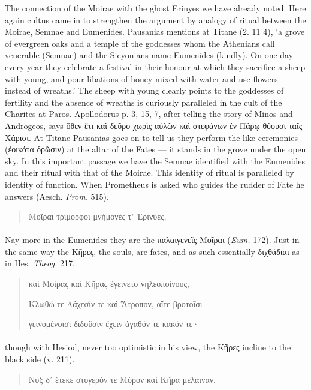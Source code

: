 \documentclass[a4paper, 11pt, oneside, polutonikogreek, english]{article}
\begin{document}
The connection of the Moirae with the ghost Erinyes we have already noted. Here again cultus came in to strengthen the argument by analogy of ritual between the Moirae, Semnae and Eumenides. Pausanias mentions at Titane (2. 11 4), `a grove of evergreen oaks and a temple of the goddesses whom the Athenians call venerable (Semnae) and the Sicyonians name Eumenides (kindly). On one day every year they celebrate a festival in their honour at which they sacrifice a sheep with young, and pour libations of honey mixed with water and use flowers instead of wreaths.' The sheep with young clearly points to the goddesses of fertility and the absence of wreaths is curiously paralleled in the cult of the Charites at Paros. Apollodorus p. 3, 15, 7, after telling the story of Minos and Androgeos, says ὅθεν ἔτι καὶ δεῦρο χωρὶς αὐλῶν καὶ στεφάνων ἐν Πάρῳ θύουσι ταῖς Χάρισι. At Titane Pausanias goes on to tell us they perform the like ceremonies (ἐοικότα δρῶσιν) at the altar of the Fates --- it stands in the grove under the open sky. In this important passage we have the Semnae identified with the Eumenides and their ritual with that of the Moirae. This identity of ritual is paralleled by identity of function. When Prometheus is asked who guides the rudder of Fate he answers (Aesch. \emph{Prom.} 515).
\begin{quotation}
Μοῖραι τρίμορφοι μνήμονές τ' Ἐρινύες.
\end{quotation}
\paragraph{}
Nay more in the Eumenides they are the παλαιγενεῖς Μοῖραι (\emph{Eum.} 172). Just in the same way the Κῆρες, the souls, are fates, and as such essentially διχθάδιαι as in Hes. \emph{Theog.} 217.
\begin{quotation}
καὶ Μοίρας καὶ Κῆρας ἐγείνετο νηλεοποίνους,

Κλωθώ τε Λάχεσίν τε καὶ Ἄτροπον, αἴτε βροτοῖσι

γεινομένοισι διδοῦσιν ἔχειν ἀγαθόν τε κακόν τε·
\end{quotation}
\paragraph{}
though with Hesiod, never too optimistic in his view, the Κῆρες incline to the black side (v. 211).
\begin{quotation}
Νὺξ δ᾽ ἔτεκε στυγερόν τε Μόρον καὶ Κῆρα μέλαιναν.
\end{quotation}
\end{document}
